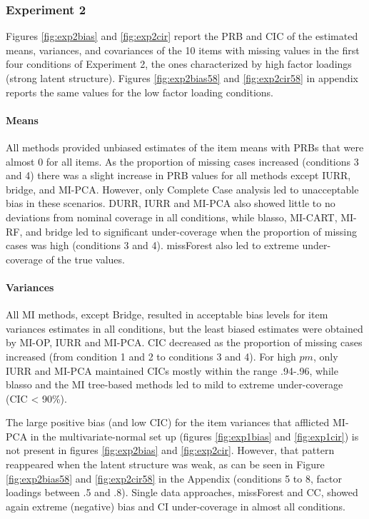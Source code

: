 \documentclass[]{./cls/interact}
\theoremstyle{plain}
\theoremstyle{definition}
\theoremstyle{remark}
\begin{document}
\FloatBarrier


\subsubsection{Experiment 2}

	Figures \ref{fig:exp2bias} and \ref{fig:exp2cir} report the PRB and CIC of the estimated means, variances, 
	and covariances of the 10 items with missing values in the first four conditions of Experiment 2, 
	the ones characterized by high factor loadings (strong latent structure).
	Figures \ref{fig:exp2bias58} and \ref{fig:exp2cir58} in appendix reports the same values for the low 
	factor loading conditions.

	\paragraph{Means}
	All methods provided unbiased estimates of the item means with PRBs that were almost 0 for all items.
	As the proportion of missing cases increased (conditions 3 and 4) there was a slight increase in 
	PRB values for all methods except IURR, bridge, and MI-PCA. 
	However, only Complete Case analysis led to unacceptable bias in these scenarios.
	DURR, IURR and MI-PCA also showed little to no deviations from nominal coverage in all conditions, 
	while blasso, MI-CART, MI-RF, and bridge led to significant under-coverage when the proportion of 
	missing cases was high (conditions 3 and 4). 
	missForest also led to extreme under-coverage of the true values.
	
	\paragraph{Variances}
	All MI methods, except Bridge, resulted in acceptable bias levels for item variances estimates in all conditions, 
	but the least biased estimates were obtained by MI-OP, IURR and MI-PCA.
	CIC decreased as the proportion of missing cases increased (from condition 1 and 2 to conditions 3 and 4).
	For high $pm$, only IURR and MI-PCA maintained CICs mostly within the range .94-.96, while blasso and the MI tree-based 
	methods led to mild to extreme under-coverage (CIC < 90\%).

	The large positive bias (and low CIC) for the item variances that afflicted MI-PCA in the multivariate-normal set up 
	(figures \ref{fig:exp1bias} and \ref{fig:exp1cir}) is not present in figures \ref{fig:exp2bias} and \ref{fig:exp2cir}.
	However, that pattern reappeared when the latent structure was weak, as can be seen in Figure \ref{fig:exp2bias58} 
	and \ref{fig:exp2cir58} in the Appendix (conditions 5 to 8, factor loadings between .5 and .8).
	Single data approaches, missForest and CC, showed again extreme (negative) bias and CI under-coverage in 
	almost all conditions.
\end{document}
